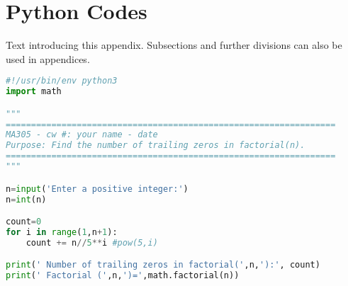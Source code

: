 \documentclass[11pt]{article}
\begin{document}
\newpage
\appendix 
\setcounter{section}{0}           
\section{Python Codes}\label{S:A}
%
Text introducing this appendix. Subsections and further divisions can also be used in appendices. 

\begin{lstlisting}[language=Python]
#!/usr/bin/env python3 
import math

"""
=================================================================
MA305 - cw #: your name - date
Purpose: Find the number of trailing zeros in factorial(n). 
=================================================================
"""

n=input('Enter a positive integer:')
n=int(n)

count=0
for i in range(1,n+1):
    count += n//5**i #pow(5,i)

print(' Number of trailing zeros in factorial(',n,'):', count)
print(' Factorial (',n,')=',math.factorial(n))


\end{lstlisting} 
\end{document}
